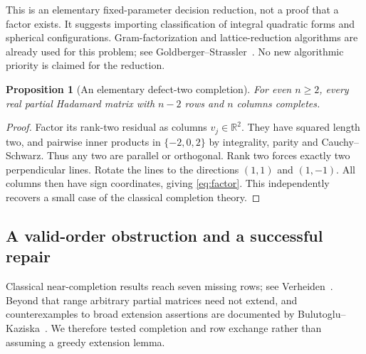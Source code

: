 \documentclass[11pt]{article}
\newtheorem{proposition}{Proposition}[section]
\newcommand{\R}{\mathbb R}
\begin{document}
This is an elementary fixed-parameter decision reduction, not a proof
that a factor exists. It suggests importing classification of integral
quadratic forms and spherical configurations. Gram-factorization and
lattice-reduction algorithms are already used for this problem;
see Goldberger--Strassler~\cite{LLL}. No new algorithmic priority is
claimed for the reduction.

\begin{proposition}[An elementary defect-two completion]
For even $n\ge2$, every real partial Hadamard matrix with $n-2$ rows
and $n$ columns completes.
\end{proposition}
\begin{proof}
Factor its rank-two residual as columns $v_j\in\R^2$. They have squared
length two, and pairwise inner products in $\{-2,0,2\}$ by integrality,
parity and Cauchy--Schwarz. Thus any two are parallel or orthogonal.
Rank two forces exactly two perpendicular lines. Rotate the lines to
the directions $(1,1)$ and $(1,-1)$. All columns then have sign
coordinates, giving \eqref{eq:factor}. This independently recovers a
small case of the classical completion theory.
\end{proof}

\subsection{A valid-order obstruction and a successful repair}
Classical near-completion results reach seven missing rows; see
Verheiden~\cite{Verheiden}. Beyond that range arbitrary partial matrices
need not extend, and counterexamples to broad extension assertions
are documented by Bulutoglu--Kaziska~\cite{BK}. We therefore tested
completion and row exchange rather than assuming a greedy extension
lemma.
\end{document}
